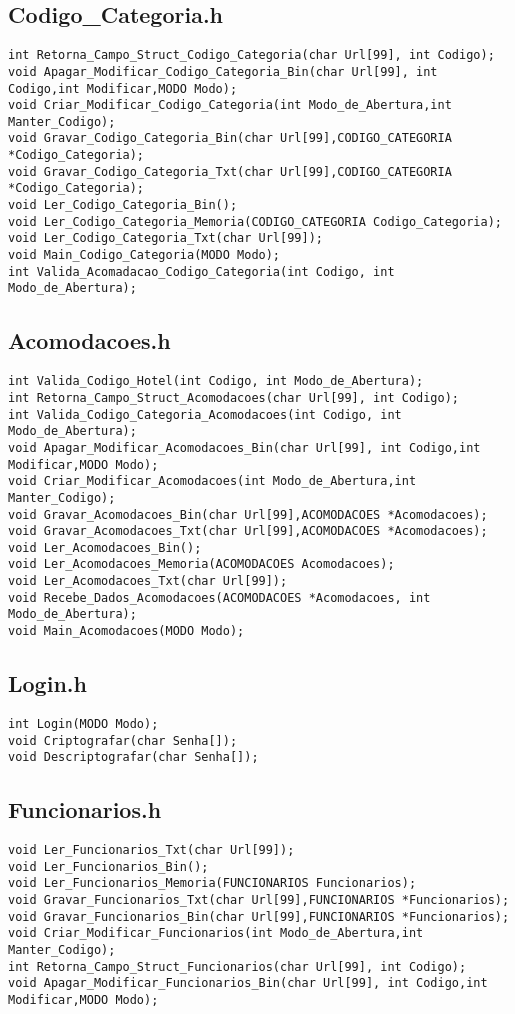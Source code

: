 \documentclass{article}
\begin{document}
\subsection{Codigo\_Categoria.h}
\begin{lstlisting}
int Retorna_Campo_Struct_Codigo_Categoria(char Url[99], int Codigo);
void Apagar_Modificar_Codigo_Categoria_Bin(char Url[99], int Codigo,int Modificar,MODO Modo);
void Criar_Modificar_Codigo_Categoria(int Modo_de_Abertura,int Manter_Codigo);
void Gravar_Codigo_Categoria_Bin(char Url[99],CODIGO_CATEGORIA *Codigo_Categoria);
void Gravar_Codigo_Categoria_Txt(char Url[99],CODIGO_CATEGORIA *Codigo_Categoria);
void Ler_Codigo_Categoria_Bin();
void Ler_Codigo_Categoria_Memoria(CODIGO_CATEGORIA Codigo_Categoria);
void Ler_Codigo_Categoria_Txt(char Url[99]);
void Main_Codigo_Categoria(MODO Modo);
int Valida_Acomadacao_Codigo_Categoria(int Codigo, int Modo_de_Abertura);
\end{lstlisting}

\subsection{Acomodacoes.h}
\begin{lstlisting}
int Valida_Codigo_Hotel(int Codigo, int Modo_de_Abertura);
int Retorna_Campo_Struct_Acomodacoes(char Url[99], int Codigo);
int Valida_Codigo_Categoria_Acomodacoes(int Codigo, int Modo_de_Abertura);
void Apagar_Modificar_Acomodacoes_Bin(char Url[99], int Codigo,int Modificar,MODO Modo);
void Criar_Modificar_Acomodacoes(int Modo_de_Abertura,int Manter_Codigo);
void Gravar_Acomodacoes_Bin(char Url[99],ACOMODACOES *Acomodacoes);
void Gravar_Acomodacoes_Txt(char Url[99],ACOMODACOES *Acomodacoes);
void Ler_Acomodacoes_Bin();
void Ler_Acomodacoes_Memoria(ACOMODACOES Acomodacoes);
void Ler_Acomodacoes_Txt(char Url[99]);
void Recebe_Dados_Acomodacoes(ACOMODACOES *Acomodacoes, int Modo_de_Abertura);
void Main_Acomodacoes(MODO Modo);
\end{lstlisting}
\subsection{Login.h}
\begin{lstlisting}
int Login(MODO Modo);
void Criptografar(char Senha[]);
void Descriptografar(char Senha[]);
\end{lstlisting}

\subsection{Funcionarios.h}
\begin{lstlisting}
void Ler_Funcionarios_Txt(char Url[99]);
void Ler_Funcionarios_Bin();
void Ler_Funcionarios_Memoria(FUNCIONARIOS Funcionarios);
void Gravar_Funcionarios_Txt(char Url[99],FUNCIONARIOS *Funcionarios);
void Gravar_Funcionarios_Bin(char Url[99],FUNCIONARIOS *Funcionarios);
void Criar_Modificar_Funcionarios(int Modo_de_Abertura,int Manter_Codigo);
int Retorna_Campo_Struct_Funcionarios(char Url[99], int Codigo);
void Apagar_Modificar_Funcionarios_Bin(char Url[99], int Codigo,int Modificar,MODO Modo);
\end{lstlisting}
\end{document}
